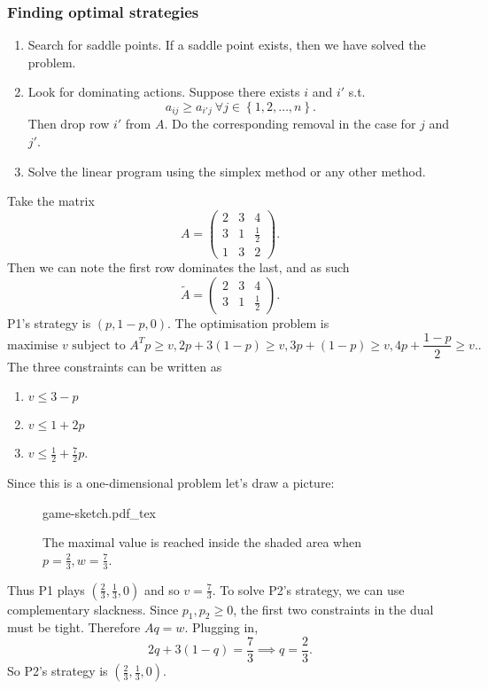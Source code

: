 \documentclass[a4paper]{scrartcl}
\newcommand{\incfig}[2]{%
    \def\svgwidth{#1mm}
    {#2.pdf_tex}
}
\begin{document}
\subsubsection{Finding optimal strategies}
\begin{enumerate}
	\item Search for saddle points. If a saddle point exists, then we have solved the problem.
	\item Look for dominating actions. Suppose there exists $i$ and $i'$ s.t. \[
	a_{ij} \geq a_{i'j} \ \forall j \in \left\{1,2,\ldots ,n\right\}
	.\] 
	Then drop row $i'$ from $A$. Do the corresponding removal in the case for $j$ and $j'$.
	\item Solve the linear program using the simplex method or any other method.
\end{enumerate}
\begin{example*}
	Take the matrix \[
	A=\begin{pmatrix} 2&3&4\\3&1&\frac{1}{2}\\1&3&2 \end{pmatrix}
	.\] Then we can note the first row dominates the last, and as such \[
	\tilde{A}=\begin{pmatrix} 2&3&4\\3&1&\frac{1}{2} \end{pmatrix}
	.\] 
	P1's strategy is $(p,1-p,0)$. The optimisation problem is \[
	\text{maximise } v \text{ subject to } A^{T}p \geq v, 2p+ 3 (1-p) \geq v, 3p+(1-p) \geq v, 4p + \frac{1-p}{2}\geq v.
	.\] The three constraints can be written as 
	\begin{enumerate}
		\item $v \leq 3-p$ 
		\item $v \leq 1+2p$ 
		\item $v \leq \frac{1}{2}+\frac{7}{2}p$.
	\end{enumerate}
	Since this is a one-dimensional problem let's draw a picture:
	\begin{figure}[H]
		\centering
		\incfig{70}{game-sketch}
		\caption{The maximal value is reached inside the shaded area when $p=\frac{2}{3}, w=\frac{7}{3}$.}
	\end{figure}
	Thus P1 plays $(\frac{2}{3},\frac{1}{3},0)$ and so $v=\frac{7}{3}$. To solve P2's strategy, we can use complementary slackness. Since $p_1 ,p_2 \geq 0$, the first two constraints in the dual must be tight. Therefore $Aq=w$. Plugging in, \[
	2q+3 (1-q)=\frac{7}{3} \implies q=\frac{2}{3}
	.\] So P2's strategy is $(\frac{2}{3},\frac{1}{3},0)$.
\end{example*}
\end{document}
